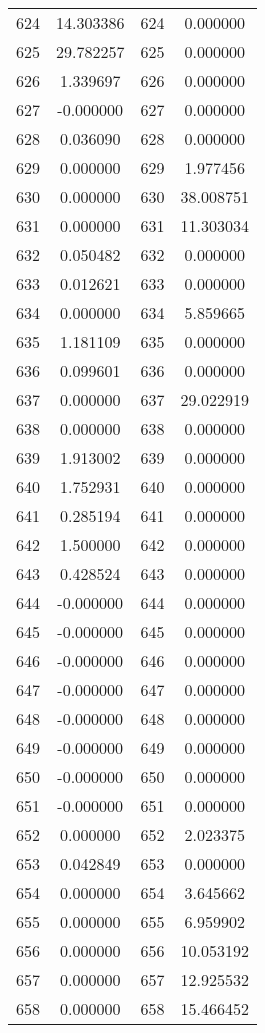 \documentclass[12pt]{article}
\begin{document}
\begin{longtable}{@{}cccc@{}}
624 & 14.303386 & 624 & 0.000000 \\
625 & 29.782257 & 625 & 0.000000 \\
626 & 1.339697 & 626 & 0.000000 \\
627 & -0.000000 & 627 & 0.000000 \\
628 & 0.036090 & 628 & 0.000000 \\
629 & 0.000000 & 629 & 1.977456 \\
630 & 0.000000 & 630 & 38.008751 \\
631 & 0.000000 & 631 & 11.303034 \\
632 & 0.050482 & 632 & 0.000000 \\
633 & 0.012621 & 633 & 0.000000 \\
634 & 0.000000 & 634 & 5.859665 \\
635 & 1.181109 & 635 & 0.000000 \\
636 & 0.099601 & 636 & 0.000000 \\
637 & 0.000000 & 637 & 29.022919 \\
638 & 0.000000 & 638 & 0.000000 \\
639 & 1.913002 & 639 & 0.000000 \\
640 & 1.752931 & 640 & 0.000000 \\
641 & 0.285194 & 641 & 0.000000 \\
642 & 1.500000 & 642 & 0.000000 \\
643 & 0.428524 & 643 & 0.000000 \\
644 & -0.000000 & 644 & 0.000000 \\
645 & -0.000000 & 645 & 0.000000 \\
646 & -0.000000 & 646 & 0.000000 \\
647 & -0.000000 & 647 & 0.000000 \\
648 & -0.000000 & 648 & 0.000000 \\
649 & -0.000000 & 649 & 0.000000 \\
650 & -0.000000 & 650 & 0.000000 \\
651 & -0.000000 & 651 & 0.000000 \\
652 & 0.000000 & 652 & 2.023375 \\
653 & 0.042849 & 653 & 0.000000 \\
654 & 0.000000 & 654 & 3.645662 \\
655 & 0.000000 & 655 & 6.959902 \\
656 & 0.000000 & 656 & 10.053192 \\
657 & 0.000000 & 657 & 12.925532 \\
658 & 0.000000 & 658 & 15.466452 \\

\end{longtable}
\end{document}
